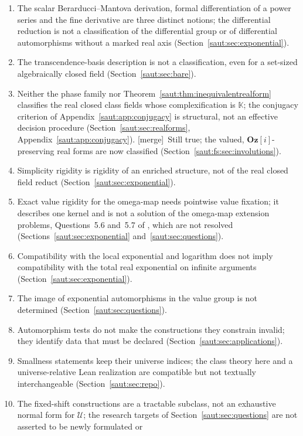 \documentclass[11pt]{article}
\theoremstyle{definition}
\theoremstyle{remark}
\newcommand{\K}{\mathbb K}
\newcommand{\U}{\mathcal U}
\newcommand{\Oz}{\mathbf{Oz}}
\newcommand{\mergetag}{\textup{[merge]}}
\numberwithin{equation}{section}
\begin{document}
\begin{enumerate}[label=\arabic*.,leftmargin=2.2em]
\item The scalar Berarducci--Mantova derivation, formal differentiation of a
power series and the fine derivative are three distinct notions; the
differential reduction is not a classification of the differential group
or of differential automorphisms without a marked real axis
(Section~\ref{saut:sec:exponential}).
\item The transcendence-basis description is not a classification, even for
a set-sized algebraically closed field (Section~\ref{saut:sec:bare}).
\item Neither the phase family nor
Theorem~\ref{saut:thm:inequivalentrealform} classifies the real closed
class fields whose complexification is $\K$; the conjugacy criterion of
Appendix~\ref{saut:app:conjugacy} is structural, not an effective decision
procedure (Section~\ref{saut:sec:realforms},
Appendix~\ref{saut:app:conjugacy}). \mergetag\ Still true; the valued,
$\Oz[i]$-preserving real forms are now classified
(Section~\ref{saut:fs:sec:involutions}).
\item Simplicity rigidity is rigidity of an enriched structure, not of the
real closed field reduct (Section~\ref{saut:sec:exponential}).
\item Exact value rigidity for the omega-map needs pointwise value
fixation; it describes one kernel and is not a solution of the omega-map
extension problems, Questions~5.6 and~5.7 of \cite{KKS}, which are not
resolved (Sections~\ref{saut:sec:exponential}
and~\ref{saut:sec:questions}).
\item Compatibility with the local exponential and logarithm does not imply
compatibility with the total real exponential on infinite arguments
(Section~\ref{saut:sec:exponential}).
\item The image of exponential automorphisms in the value group is not
determined (Section~\ref{saut:sec:questions}).
\item Automorphism tests do not make the constructions they constrain
invalid; they identify data that must be declared
(Section~\ref{saut:sec:applications}).
\item Smallness statements keep their universe indices; the class theory
here and a universe-relative Lean realization are compatible but not
textually interchangeable (Section~\ref{saut:sec:repo}).
\item The fixed-shift constructions are a tractable subclass, not an
exhaustive normal form for $\U$; the research targets of
Section~\ref{saut:sec:questions} are not asserted to be newly formulated or

\end{enumerate}
\end{document}
